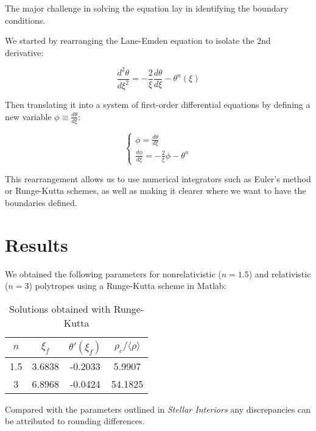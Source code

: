 \documentclass[twoside]{article}
\begin{document}
\begin{multicols}{2}
The major challenge in solving the equation lay in identifying the boundary
conditions. 

We started by rearranging the Lane-Emden equation to isolate the 2nd derivative:

\begin{equation}
    \frac{d^2\theta}{d\xi^2}=-\frac{2}{\xi}\frac{d\theta}{d\xi}-\theta^n(\xi)
\end{equation}

Then translating it into a system of first-order differential equations by
defining a new variable \(\phi\equiv\frac{d\theta}{d\xi}\):

\begin{equation}
    \left\{\begin{array}{l}
        \phi = \frac{d\theta}{d\xi} \\
        \frac{d\phi}{d\xi} = -\frac{2}{\xi}\phi - \theta^n
    \end{array}\right.
\end{equation}

This rearrangement allows us to use numerical integrators such as Euler's method
or Runge-Kutta schemes, as well as making it clearer where we want to have the
boundaries defined.


\section{Results}

We obtained the following parameters for nonrelativistic (\(n=1.5\)) and
relativistic (\(n=3\)) polytropes using a Runge-Kutta scheme in Matlab:

\begin{table}[H]
\caption{Solutions obtained with Runge-Kutta}
\centering
\begin{tabular}{c | c c c}
\toprule
\(n\) & \(\xi_f\) & \(\theta'(\xi_f)\) & \(\rho_c/\langle \rho \rangle\) \\
\midrule
1.5 & 3.6838 & -0.2033 & 5.9907 \\
3 & 6.8968 & -0.0424 & 54.1825 \\
\bottomrule
\end{tabular}
\end{table}


Compared with the parameters outlined in \textit{Stellar
Interiors}\cite{hansen2004} any discrepancies can be attributed to rounding
differences.


\end{multicols}
\end{document}
